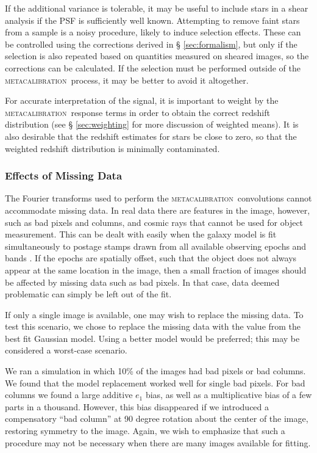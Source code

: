 \documentclass[iop]{emulateapj}
\newcommand{\mcal}{\textsc{metacalibration}}
\begin{document}
If the additional variance is tolerable, it may be useful to include stars in a
shear analysis if the PSF is sufficiently well known.  Attempting to remove
faint stars from a sample is a noisy procedure, likely to induce selection
effects.  These can be controlled using the corrections derived in \S
\ref{sec:formalism}, but only if the selection is also repeated based on
quantities measured on sheared images, so the corrections can be calculated.
If the selection must be performed outside of the \mcal\ process, it may be
better to avoid it altogether.

For accurate interpretation of the signal, it is important to weight by the
\mcal\ response terms in order to obtain the correct redshift distribution (see \S
\ref{sec:weighting} for more discussion of weighted means).  It is also
desirable that the redshift estimates for stars be close to zero, so that the
weighted redshift distribution is minimally contaminated.






\subsubsection{Effects of Missing Data}

The Fourier transforms used to perform the \mcal\ convolutions cannot
accommodate missing data.  In real data there are features in the image,
however, such as bad pixels and columns, and cosmic rays that cannot be used
for object measurement.  This can be dealt with easily when the galaxy model is
fit simultaneously to postage stamps drawn from all available observing epochs
and bands \citep[e.g.][]{Jarvis2016}.  If the epochs are spatially offset, such
that the object does not always appear at the same location in the image, then
a small fraction of images should be affected by missing data such as bad
pixels.  In that case, data deemed problematic can simply be left out of the
fit.

If only a single image is available, one may wish to replace the missing data.
To test this scenario, we chose to replace the missing data with the value from
the best fit Gaussian model.  Using a better model would be preferred; this may
be considered a worst-case scenario.

We ran a simulation in which 10\% of the images had bad pixels or bad columns.
We found that the model replacement worked well for single bad pixels. For bad
columns we found a large additive $e_1$ bias, as well as a multiplicative bias
of a few parts in a thousand.  However, this bias disappeared if we introduced
a compensatory ``bad column'' at 90 degree rotation about the center of the
image, restoring symmetry to the image.   Again, we wish to emphasize that such
a procedure may not be necessary when there are many images available for
fitting.
\end{document}
